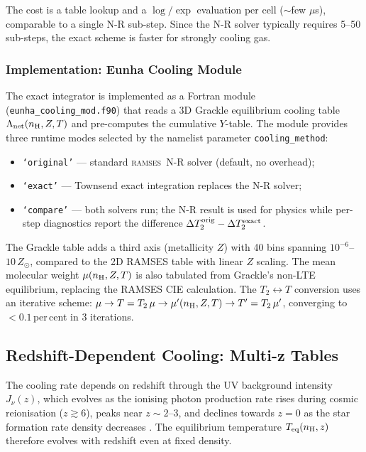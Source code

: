 \documentclass[fleqn,usenatbib]{mnras}
\newcommand{\ramses}{\textsc{ramses}}
\newcommand{\code}[1]{\texttt{#1}}
\begin{document}
The cost is a table lookup and a $\log/\exp$ evaluation per cell
($\sim$few $\mu$s), comparable to a single N-R sub-step.  Since the N-R
solver typically requires 5--50 sub-steps, the exact scheme is faster
for strongly cooling gas.

\subsubsection{Implementation: Eunha Cooling Module}

The exact integrator is implemented as a Fortran module
(\code{eunha\_cooling\_mod.f90}) that reads a 3D Grackle equilibrium
cooling table $\Lambda_{\rm net}(n_{\rm H}, Z, T)$ and pre-computes
the cumulative $Y$-table.  The module provides three runtime modes
selected by the namelist parameter \code{cooling\_method}:
\begin{itemize}
  \item \code{`original'} --- standard \ramses\ N-R solver (default,
    no overhead);
  \item \code{`exact'} --- Townsend exact integration replaces the N-R
    solver;
  \item \code{`compare'} --- both solvers run; the N-R result is used
    for physics while per-step diagnostics report the difference
    $\Delta T_2^{\rm orig} - \Delta T_2^{\rm exact}$.
\end{itemize}

The Grackle table adds a third axis (metallicity $Z$) with 40 bins
spanning $10^{-6}$--$10\,Z_\odot$, compared to the 2D RAMSES table
with linear $Z$ scaling.  The mean molecular weight $\mu(n_{\rm H}, Z, T)$
is also tabulated from Grackle's non-LTE equilibrium, replacing the
RAMSES CIE calculation.  The $T_2 \leftrightarrow T$ conversion uses an
iterative scheme: $\mu \to T = T_2\,\mu \to \mu'(n_{\rm H}, Z, T) \to
T' = T_2\,\mu'$, converging to $<0.1$\,per\,cent in 3 iterations.


\subsection{Redshift-Dependent Cooling: Multi-z Tables}
\label{sec:multi_z}

The cooling rate depends on redshift through the UV background
intensity $J_\nu(z)$, which evolves as the ionising photon production
rate rises during cosmic reionisation ($z \gtrsim 6$), peaks near
$z \sim 2$--$3$, and declines towards $z = 0$ as the star formation
rate density decreases \citep{HM2012, FG2020}.
The equilibrium temperature
$T_{\rm eq}(n_{\rm H}, z)$ therefore evolves with redshift even at
fixed density.
\end{document}

